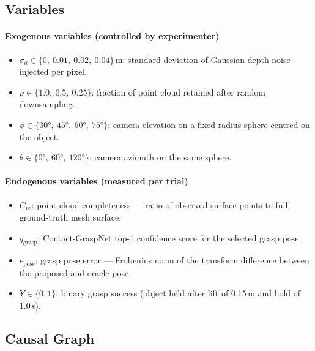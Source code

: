 \documentclass[journal]{IEEEtran}
\begin{document}
\subsection{Variables}

\paragraph{Exogenous variables (controlled by experimenter)}
\begin{itemize}
  \item $\sigma_d \in \{0,\ 0.01,\ 0.02,\ 0.04\}$\,m: standard
        deviation of Gaussian depth noise injected per pixel.
  \item $\rho \in \{1.0,\ 0.5,\ 0.25\}$: fraction of point cloud
        retained after random downsampling.
  \item $\phi \in \{30°,\ 45°,\ 60°,\ 75°\}$: camera elevation
        on a fixed-radius sphere centred on the object.
  \item $\theta \in \{0°,\ 60°,\ 120°\}$: camera azimuth on the
        same sphere.
\end{itemize}

\paragraph{Endogenous variables (measured per trial)}
\begin{itemize}
  \item $C_{pc}$: point cloud completeness --- ratio of observed
        surface points to full ground-truth mesh surface.
  \item $q_{\text{grasp}}$: Contact-GraspNet top-1 confidence score
        for the selected grasp pose.
  \item $e_{\text{pose}}$: grasp pose error --- Frobenius norm of
        the transform difference between the proposed and oracle pose.
  \item $Y \in \{0,1\}$: binary grasp success (object held after
        lift of 0.15\,m and hold of 1.0\,s).
\end{itemize}

\subsection{Causal Graph}
\end{document}

